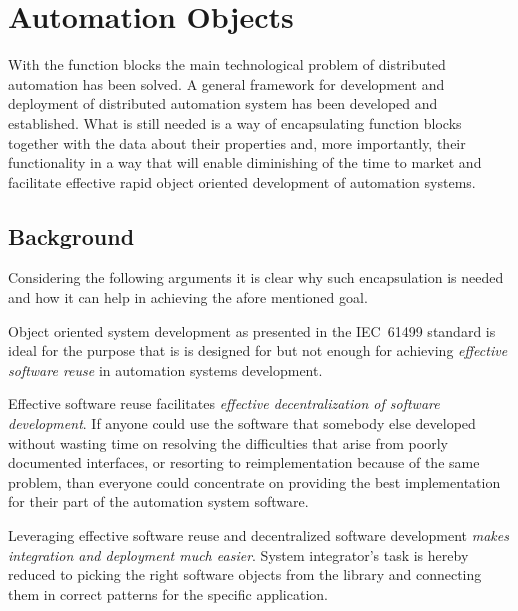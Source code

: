 \chapter{Automation Objects}
\label{automationobjects}

With the function blocks the main technological problem of
distributed automation has been solved. A general framework
for development and deployment of distributed automation
system has been developed and established. What is still
needed is a way of encapsulating function blocks together
with the data about their properties and, more importantly,
their functionality in a way that will enable diminishing of
the time to market and facilitate effective rapid object
oriented development of automation systems.

\section{Background}
Considering the following arguments it is clear why such
encapsulation is needed and how it can help in achieving the
afore mentioned goal.

Object oriented system development as presented in the
IEC~61499 standard is ideal for the purpose that is is
designed for but not enough for achieving {\it effective
  software reuse} in automation systems development.



Effective software reuse facilitates \textit{effective
  decentralization of software development}. If anyone could
use the software that somebody else developed without
wasting time on resolving the difficulties that arise from
poorly documented interfaces, or resorting to
reimplementation because of the same problem, than everyone
could concentrate on providing the best implementation for
their part of the automation system software.

Leveraging effective software reuse and decentralized
software development \textit{makes integration and
  deployment much easier}. System integrator's task is
hereby reduced to picking the right software objects from
the library and connecting them in correct patterns for the
specific application.

